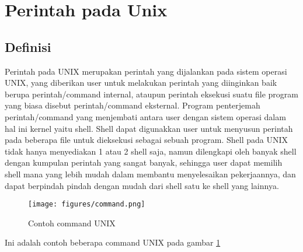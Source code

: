 \section{Perintah pada Unix}
		\subsection{Definisi}
		\hspace*{1cm}Perintah pada UNIX merupakan perintah yang dijalankan pada sistem operasi UNIX, yang diberikan user untuk melakukan perintah yang diinginkan baik berupa perintah/command internal, ataupun perintah eksekusi suatu file program yang biasa disebut perintah/command eksternal. Program penterjemah perintah/command yang menjembati antara user dengan sistem operasi dalam hal ini kernel yaitu shell. Shell dapat digunakkan user untuk menyusun perintah pada beberapa file untuk dieksekusi sebagai sebuah program. Shell pada UNIX tidak hanya menyediakan 1 atau 2 shell saja, namun dilengkapi oleh banyak shell dengan kumpulan perintah yang sangat banyak, sehingga user dapat memilih shell mana yang lebih mudah dalam membantu menyelesaikan pekerjaannya, dan dapat berpindah pindah dengan mudah dari shell satu ke shell yang lainnya.
		\begin{figure}[ht]
			\centerline{\texttt{[image: figures/command.png]}}
			\caption{Contoh command UNIX}
			\label{command}
			\end{figure}
		\vspace{1cm}Ini adalah contoh beberapa command UNIX pada gambar \ref{command} 